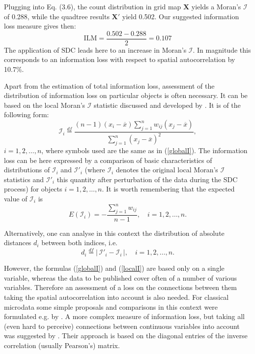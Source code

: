 \begin{tcolorbox}[breakable]
Plugging into Eq. (3.6), the count distribution in grid map $\mathbf{X}$ yields a Moran's $\mathcal{I}$ of 0.288, while the quadtree results $\mathbf{X}'$ yield 0.502. Our suggested information loss measure gives then:
\[
\mathrm{ILM}=\frac{0.502-0.288}{2}=0.107
\]
The application of SDC leads here to an increase in Moran's $\mathcal{I}$. In magnitude this corresponds to an information loss with respect to spatial autocorrelation by 10.7\%.    

\end{tcolorbox}

Apart from the estimation of total information loss, assessment of the distribution of information loss on particular objects is often necessary. It can be based on the local Moran's $\mathcal{I}$ statistic discussed and developed by \cite{Anselin1995}. It is of the following form:
\begin{equation}
 \mathcal{I}_i\stackrel{df}{=}\frac{(n-1)(x_i-\overline{x})\sum_{j=1}^n{w_{ij}(x_j-\overline{x})}}{\sum_{j=1}^n{(x_j-\overline{x})^2}},
\label{localI}
\end{equation}
$i=1,2,\ldots,n$, where symbols used are the same as in (\ref{globalI}). The information loss can be here expressed by a comparison of basic characteristics of distributions of $\mathcal{I}_i$ and $\mathcal{I}'_i$ (where $\mathcal{I}_i$ denotes the original local Moran's $\mathcal{I}$ statistics and $\mathcal{I}'_i$ this quantity after perturbation of the data during the SDC process) for objects $i=1,2,\ldots,n$. It is worth remembering that the expected value of $\mathcal{I}_i$ is
\[
E(\mathcal{I}_i)=-\frac{\sum_{j=1}^n{w_{ij}}}{n-1},\quad i=1,2,\ldots,n.
\]

Alternatively, one can analyse in this context the distribution of absolute distances $d_i$ between both indices, i.e.
\begin{equation}
d_i\stackrel{df}{=}\left|\,\mathcal{I}'_i- \mathcal{I}_i\,\right|,\quad i=1,2,\ldots,n.
\label{eq:d_i}
\end{equation}

However, the formulas (\ref{globalI}) and (\ref{localI}) are based only on a single variable, whereas the data to be published cover often of a number of various variables. Therefore an assessment of a loss on the connections between them taking the spatial autocorrelation into account is also needed. For classical microdata some simple proposals and comparisons in this context were formulated e.g. by \cite{Domingo2001}. A more complex measure of information loss, but taking all (even hard to perceive) connections between continuous variables into account was suggested by \cite{Mlodak2022}. Their approach is based on the diagonal entries of the inverse correlation (usually Pearson's) matrix.

